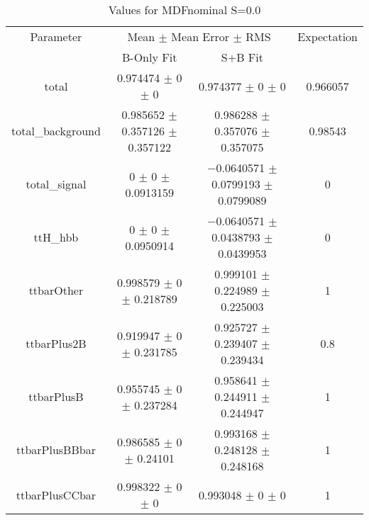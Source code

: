 \begin{table}
\centering
\caption{Values for MDFnominal S=0.0}
\begin{tabular}{cccc}
\toprule
Parameter & \multicolumn{2}{c}{Mean $\pm$ Mean Error $\pm$ RMS} & Expectation\\
 & B-Only Fit & S+B Fit & \\
\midrule
total & \num{0.974474} $\pm$ \num{0} $\pm$ \num{0} & \num{0.974377} $\pm$ \num{0} $\pm$ \num{0} & \num{0.966057}\\
total\_background & \num{0.985652} $\pm$ \num{0.357126} $\pm$ \num{0.357122} & \num{0.986288} $\pm$ \num{0.357076} $\pm$ \num{0.357075} & \num{0.98543}\\
total\_signal & \num{0} $\pm$ \num{0} $\pm$ \num{0.0913159} & \num{-0.0640571} $\pm$ \num{0.0799193} $\pm$ \num{0.0799089} & \num{0}\\
ttH\_hbb & \num{0} $\pm$ \num{0} $\pm$ \num{0.0950914} & \num{-0.0640571} $\pm$ \num{0.0438793} $\pm$ \num{0.0439953} & \num{0}\\
ttbarOther & \num{0.998579} $\pm$ \num{0} $\pm$ \num{0.218789} & \num{0.999101} $\pm$ \num{0.224989} $\pm$ \num{0.225003} & \num{1}\\
ttbarPlus2B & \num{0.919947} $\pm$ \num{0} $\pm$ \num{0.231785} & \num{0.925727} $\pm$ \num{0.239407} $\pm$ \num{0.239434} & \num{0.8}\\
ttbarPlusB & \num{0.955745} $\pm$ \num{0} $\pm$ \num{0.237284} & \num{0.958641} $\pm$ \num{0.244911} $\pm$ \num{0.244947} & \num{1}\\
ttbarPlusBBbar & \num{0.986585} $\pm$ \num{0} $\pm$ \num{0.24101} & \num{0.993168} $\pm$ \num{0.248128} $\pm$ \num{0.248168} & \num{1}\\
ttbarPlusCCbar & \num{0.998322} $\pm$ \num{0} $\pm$ \num{0} & \num{0.993048} $\pm$ \num{0} $\pm$ \num{0} & \num{1}\\
\bottomrule
\end{tabular}
\end{table}